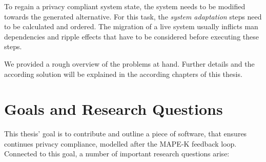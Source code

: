To regain a privacy compliant system state, the system needs to be modified towards the generated alternative. For this task, the \textit{system adaptation} steps need to be calculated and ordered. The migration of a live system usually inflicts man dependencies and ripple effects that have to be considered before executing these steps.

We provided a rough overview of the problems at hand. Further details and the according solution will be explained in the according chapters of this thesis.


%
%


\section{Goals and Research Questions}
\label{sec:Introduction:goals}

This thesis' goal is to contribute and outline a piece of software, that ensures continues privacy compliance, modelled after the MAPE-K feedback loop. Connected to this goal, a number of important research questions arise:

